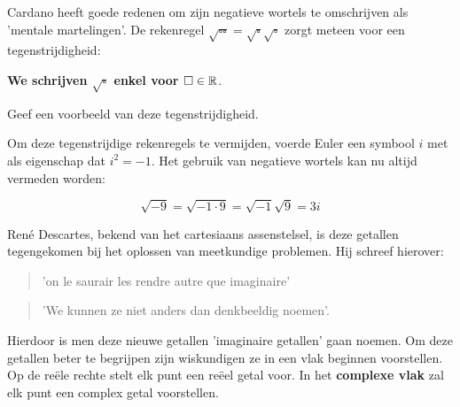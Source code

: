 \documentclass{ximera}
\begin{document}



\begin{remark}
    Cardano heeft goede redenen om zijn negatieve wortels te omschrijven als 'mentale martelingen'.
    De rekenregel \(\sqrt{\square \square} = \sqrt{\square}\sqrt{\square}\) zorgt meteen voor een tegenstrijdigheid: 
    \begin{center} 
        \textbf{We schrijven \(\sqrt{\square}\) enkel voor \( \square \in \mathbb{R} \)}. 
    \end{center}
\end{remark}


 
\begin{quickquestion*}{}
	Geef een voorbeeld van deze tegenstrijdigheid. 
\end{quickquestion*}


Om deze tegenstrijdige rekenregels te vermijden, voerde Euler een symbool \(i\) met als eigenschap dat \textbf{\(i^2 = -1\)}.
Het gebruik van negatieve wortels kan nu altijd vermeden worden: 

\[ \sqrt{-9} = \sqrt{-1 \cdot 9} = \sqrt{-1} \sqrt{9} = 3i  \]



René Descartes, bekend van het cartesiaans assenstelsel,  is deze getallen tegengekomen bij het oplossen van meetkundige problemen. Hij schreef hierover: 

\begin{quote}
    'on le saurair les rendre autre que imaginaire' 
\end{quote}
\begin{quote}
    'We kunnen ze niet anders dan denkbeeldig noemen'.
\end{quote}

Hierdoor is men deze nieuwe getallen 'imaginaire getallen' gaan noemen. Om deze getallen beter te begrijpen zijn wiskundigen ze in een vlak beginnen voorstellen. Op de reële rechte stelt elk punt een reëel getal voor. In het \textbf{complexe vlak} zal elk punt een complex getal voorstellen. 
\end{document}
